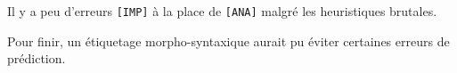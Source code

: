 \documentclass[a4paper,12pt]{article}
\begin{document}
 Il y a peu d'erreurs \verb![IMP]! à la place de \verb![ANA]! malgré les heuristiques brutales.
 
 Pour finir, un étiquetage morpho-syntaxique aurait pu éviter certaines erreurs de prédiction.


%
%
\end{document}
